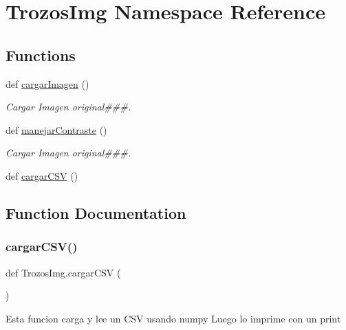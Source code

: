 \hypertarget{namespace_trozos_img}{}\section{Trozos\+Img Namespace Reference}
\label{namespace_trozos_img}
\subsection*{Functions}
\begin{DoxyCompactItemize}
\item 
def \mbox{\hyperlink{namespace_trozos_img_ae22231922ec185deb231780b1f85c58b}{cargar\+Imagen}} ()
\begin{DoxyCompactList}\small\item\em Cargar Imagen original\#\#\#. \end{DoxyCompactList}\item 
def \mbox{\hyperlink{namespace_trozos_img_a5a058cc8df2ddeae9201cded551a0a74}{manejar\+Contraste}} ()
\begin{DoxyCompactList}\small\item\em Cargar Imagen original\#\#\#. \end{DoxyCompactList}\item 
def \mbox{\hyperlink{namespace_trozos_img_a09c6bc8dd543639e88bf762223d2367e}{cargar\+C\+SV}} ()
\end{DoxyCompactItemize}


\subsection{Function Documentation}
\mbox{\label{namespace_trozos_img_a09c6bc8dd543639e88bf762223d2367e}} 
\subsubsection{\texorpdfstring{cargar\+C\+S\+V()}{cargarCSV()}}
{\footnotesize\ttfamily def Trozos\+Img.\+cargar\+C\+SV (\begin{DoxyParamCaption}{ }\end{DoxyParamCaption})}

\begin{DoxyVerb}Esta funcion carga y lee un CSV usando numpy
Luego lo imprime con un print
\end{DoxyVerb}
 \mbox{\label{namespace_trozos_img_ae22231922ec185deb231780b1f85c58b}} 

